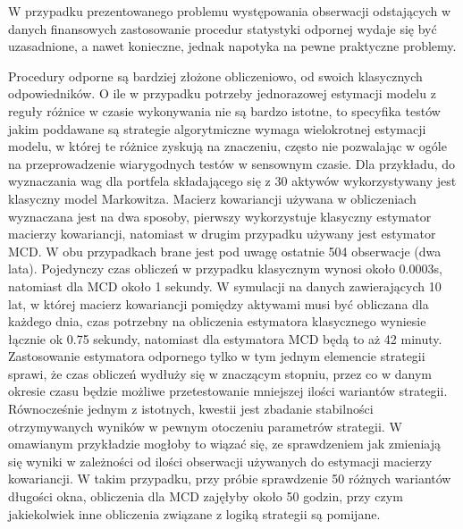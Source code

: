 \documentclass[a4paper,12pt,openany, DIV=calc, headsepline]{scrbook}
\begin{document}
W przypadku prezentowanego problemu występowania obserwacji odstających w danych finansowych zastosowanie procedur statystyki odpornej wydaje się być uzasadnione, a nawet konieczne, jednak napotyka na pewne praktyczne problemy.

Procedury odporne są bardziej złożone obliczeniowo, od swoich klasycznych odpowiedników. O ile w przypadku potrzeby jednorazowej estymacji modelu z reguły różnice w czasie wykonywania nie są bardzo istotne, to specyfika testów jakim poddawane są strategie algorytmiczne wymaga wielokrotnej estymacji modelu, w której te różnice zyskują na znaczeniu, często nie pozwalając w ogóle na przeprowadzenie wiarygodnych testów w sensownym czasie. Dla przykładu, do wyznaczania wag dla portfela składającego się z 30 aktywów wykorzystywany jest klasyczny model Markowitza. Macierz kowariancji używana w obliczeniach wyznaczana jest na dwa sposoby, pierwszy wykorzystuje klasyczny estymator macierzy kowariancji, natomiast w drugim przypadku używany jest estymator MCD. W obu przypadkach brane jest pod uwagę ostatnie 504 obserwacje (dwa lata). Pojedynczy czas obliczeń w przypadku klasycznym wynosi około 0.0003s, natomiast dla MCD około 1 sekundy. W symulacji na danych zawierających 10 lat, w której macierz kowariancji pomiędzy aktywami musi być obliczana dla każdego dnia, czas potrzebny na obliczenia estymatora klasycznego wyniesie łącznie ok 0.75 sekundy, natomiast dla estymatora MCD będą to aż 42 minuty. Zastosowanie estymatora odpornego tylko w tym jednym elemencie strategii sprawi, że czas obliczeń wydłuży się w znaczącym stopniu, przez co w danym okresie czasu będzie możliwe przetestowanie mniejszej ilości wariantów strategii. Równocześnie jednym z istotnych, kwestii jest zbadanie stabilności otrzymywanych wyników w pewnym otoczeniu parametrów strategii. W omawianym przykładzie mogłoby to wiązać się, ze sprawdzeniem jak zmieniają się wyniki w zależności od ilości obserwacji używanych do estymacji macierzy kowariancji. W takim przypadku, przy próbie sprawdzenie 50 różnych wariantów długości okna, obliczenia dla MCD zajęłyby około 50 godzin, przy czym jakiekolwiek inne obliczenia związane z logiką strategii są pomijane. 
\end{document}
